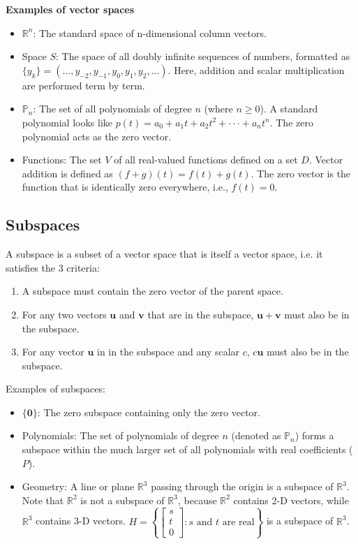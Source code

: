 \documentclass[../linear-algebra.tex]{subfiles}
\begin{document}
\textbf{Examples of vector spaces}
\begin{itemize}
    \item $\mathbb{R}^{n}$: The standard space of n-dimensional column vectors.
    \item Space $S$: The space of all doubly infinite sequences of numbers, formatted as $\{y_{k}\}=(...,y_{-2},y_{-1},y_{0},y_{1},y_{2},...)$.
    Here, addition and scalar multiplication are performed term by term.
    \item $\mathbb{P}_{n}$: The set of all polynomials of degree $n$ (where $n\ge0$). A standard polynomial looks like $p(t)=a_{0}+a_{1}t+a_{2}t^{2}+\cdot\cdot\cdot+a_{n}t^{n}$.
    The zero polynomial acts as the zero vector.
    \item Functions: The set $V$ of all real-valued functions defined on a set $D$. Vector addition is defined as $(f+g)(t) = f(t)+g(t)$.
    The zero vector is the function that is identically zero everywhere, i.e., $f(t)=0$.
\end{itemize}

\subsection{Subspaces}
A subspace is a subset of a vector space that is itself a vector space, i.e. it satisfies the 3 criteria:
\begin{enumerate}
    \item A subspace must contain the zero vector of the parent space.
    \item For any two vectors $\mathbf{u}$ and $\mathbf{v}$ that are in the subspace, $\mathbf{u}+\mathbf{v}$ must also be in the subspace.
    \item For any vector $\mathbf{u}$ in in the subspace and any scalar $c$, $c\mathbf{u}$ must also be in the subspace.
\end{enumerate}
Examples of subspaces:
\begin{itemize}
    \item $\{\mathbf{0}\}$: The zero subspace containing only the zero vector.
    \item Polynomials: The set of polynomials of degree $n$ (denoted as $\mathbb{P}_{n}$) forms a subspace within the much larger set of all polynomials with real coefficients ($P$).
    \item Geometry: A line or plane $\mathbb{R}^3$ passing through the origin is a subspace of $\mathbb{R}^3$.\newline
    Note that $\mathbb{R}^2$ is not a subspace of $\mathbb{R}^3$, because $\mathbb{R}^2$ contains 2-D vectors, while $\mathbb{R}^3$ contains 3-D vectors.\newline
    $H = \left\{ \begin{bmatrix} s \\ t \\ 0 \end{bmatrix} : s \text{ and } t \text{ are real} \right\}$ is a subspace of $\mathbb{R}^3$.  
\end{itemize}
\end{document}
